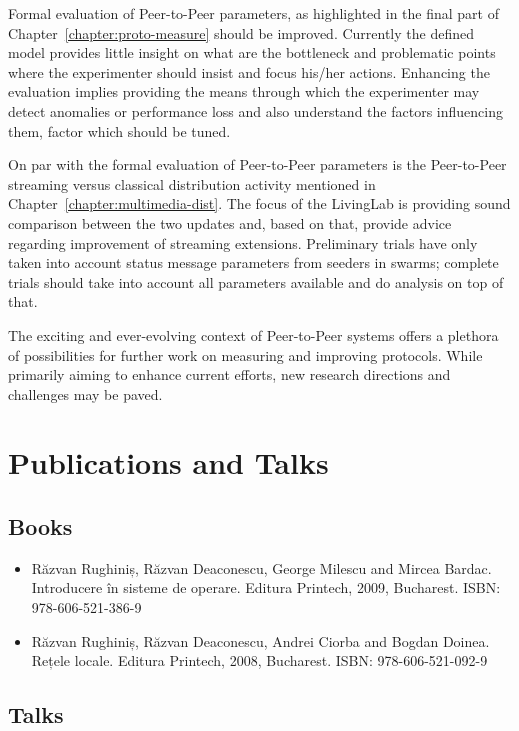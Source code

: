 Formal evaluation of Peer-to-Peer parameters, as highlighted in the final part
of Chapter~\ref{chapter:proto-measure} should be improved. Currently the
defined model provides little insight on what are the bottleneck and
problematic points where the experimenter should insist and focus his/her
actions. Enhancing the evaluation implies providing the means through which
the experimenter may detect anomalies or performance loss and also understand
the factors influencing them, factor which should be tuned.

On par with the formal evaluation of Peer-to-Peer parameters is the
Peer-to-Peer streaming versus classical distribution activity mentioned in
Chapter~\ref{chapter:multimedia-dist}. The focus of the LivingLab is
providing sound comparison between the two updates and, based on that, provide
advice regarding improvement of streaming extensions. Preliminary trials have
only taken into account status message parameters from seeders in swarms;
complete trials should take into account all parameters available and do
analysis on top of that.

The exciting and ever-evolving context of Peer-to-Peer systems offers a
plethora of possibilities for further work on measuring and improving
protocols. While primarily aiming to enhance current efforts, new research
directions and challenges may be paved.

\section{Publications and Talks}
\label{sec:conclusion:publications}

\subsection{Books}

\begin{itemize}
  \item Răzvan Rughiniș, Răzvan Deaconescu, George Milescu and Mircea Bardac.
  Introducere în sisteme de operare. Editura Printech, 2009, Bucharest. ISBN:
  978-606-521-386-9
  \item Răzvan Rughiniș, Răzvan Deaconescu, Andrei Ciorba and Bogdan Doinea.
  Rețele locale. Editura Printech, 2008, Bucharest. ISBN: 978-606-521-092-9
\end{itemize}

\subsection{Talks}

